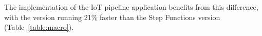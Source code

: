 The \name{} implementation of the IoT pipeline application benefits from this
difference, with the \name{} version running 21\% faster than the Step Functions
version (Table~\ref{table:macro}).

%
%
%
%
%
%

